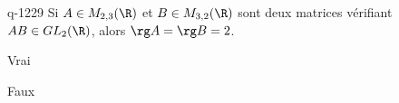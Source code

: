 \begin{truefalse}{q-1229}
Si $A\in M_{2,3}(\R)$ et $B \in M_{3,2}(\R)$ sont deux matrices vérifiant $AB \in GL_2(\R)$, alors $\rg A = \rg B = 2$.
\item* Vrai
\item Faux
\end{truefalse}

